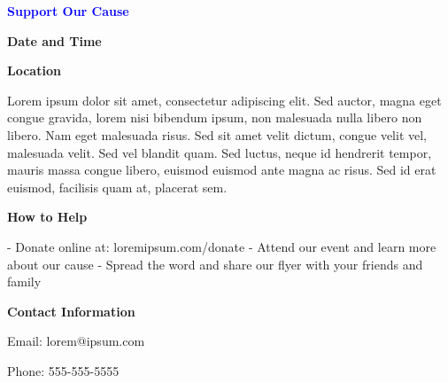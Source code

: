 \documentclass[11pt]{article}
\begin{document}
\begin{center}


\vspace{1cm}

{\Large\textbf{\textcolor{blue}{Support Our Cause}}}

\vspace{0.5cm}

{\large\textbf{Date and Time}}

\vspace{0.5cm}

{\large\textbf{Location}}

\vspace{1cm}

Lorem ipsum dolor sit amet, consectetur adipiscing elit. Sed auctor, magna eget congue gravida, lorem nisi bibendum ipsum, non malesuada nulla libero non libero. Nam eget malesuada risus. Sed sit amet velit dictum, congue velit vel, malesuada velit. Sed vel blandit quam. Sed luctus, neque id hendrerit tempor, mauris massa congue libero, euismod euismod ante magna ac risus. Sed id erat euismod, facilisis quam at, placerat sem.

\vspace{1cm}

{\large\textbf{How to Help}}

\vspace{0.5cm}

- Donate online at: loremipsum.com/donate
- Attend our event and learn more about our cause
- Spread the word and share our flyer with your friends and family

\vspace{1cm}

{\large\textbf{Contact Information}}

\vspace{0.5cm}

Email: lorem@ipsum.com

Phone: 555-555-5555

\end{center}
\end{document}
